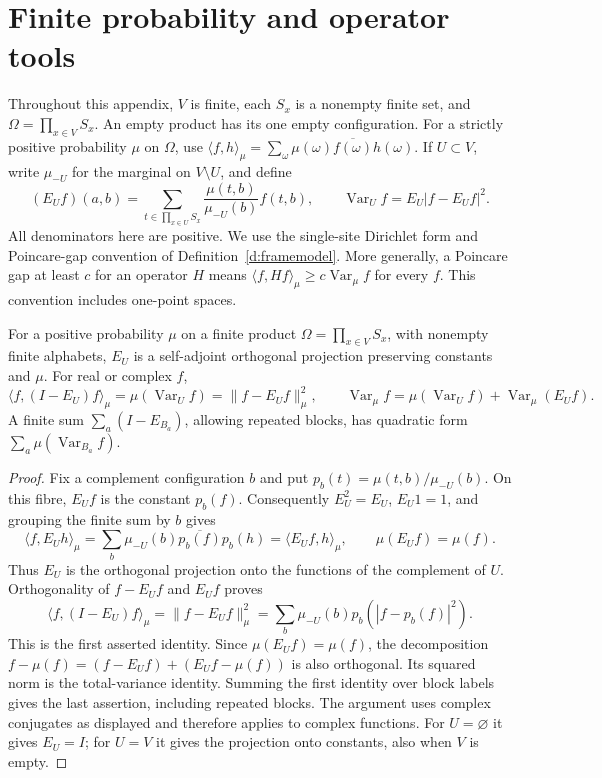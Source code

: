 \section{Finite probability and operator tools}
\label{a:finite}

Throughout this appendix, \(V\) is finite, each \(S_x\) is a
nonempty finite set, and \(\Omega=\prod_{x\in V}S_x\).
An empty product has its one empty configuration.  For a strictly
positive probability \(\mu\) on \(\Omega\), use
\(\langle f,h\rangle_\mu=\sum_\omega\mu(\omega)
\overline{f(\omega)}h(\omega)\).  If \(U\subset V\), write
\(\mu_{-U}\) for the marginal on \(V\setminus U\), and define
\[
 (E_Uf)(a,b)=\sum_{t\in\prod_{x\in U}S_x}
       \frac{\mu(t,b)}{\mu_{-U}(b)}f(t,b),\qquad
 \operatorname{Var}_U f=E_U|f-E_Uf|^2.
\]
All denominators here are positive.  We use the single-site Dirichlet
form and Poincare-gap convention of Definition~\ref{d:framemodel}.
More generally, a Poincare gap at least \(c\) for an operator \(H\)
means \(\langle f,Hf\rangle_\mu\ge c\operatorname{Var}_\mu f\)
for every \(f\).  This convention includes one-point spaces.

\begin{lemma}\label{l:CE}
For a positive probability \(\mu\) on a finite product
\(\Omega=\prod_{x\in V}S_x\), with nonempty finite alphabets,
\(E_U\) is a self-adjoint orthogonal projection preserving constants
and \(\mu\). For real or complex \(f\),
\[
 \langle f,(I-E_U)f\rangle_\mu
   =\mu(\operatorname{Var}_U f)=\|f-E_Uf\|_\mu^2,\qquad
 \operatorname{Var}_\mu f=\mu(\operatorname{Var}_U f)
                          +\operatorname{Var}_\mu(E_Uf).
\]
A finite sum \(\sum_a(I-E_{B_a})\), allowing repeated blocks,
has quadratic form \(\sum_a\mu(\operatorname{Var}_{B_a}f)\).
\end{lemma}

\begin{proof}
Fix a complement configuration \(b\) and put
\(p_b(t)=\mu(t,b)/\mu_{-U}(b)\).
On this fibre, \(E_Uf\) is the constant \(p_b(f)\).  Consequently
\(E_U^2=E_U\), \(E_U1=1\), and grouping the finite sum by \(b\)
gives
\[
 \langle f,E_Uh\rangle_\mu
   =\sum_b\mu_{-U}(b)\overline{p_b(f)}p_b(h)
   =\langle E_Uf,h\rangle_\mu,
 \qquad \mu(E_Uf)=\mu(f).
\]
Thus \(E_U\) is the orthogonal projection onto the functions of
the complement of \(U\).  Orthogonality of \(f-E_Uf\) and \(E_Uf\)
proves
\[
 \langle f,(I-E_U)f\rangle_\mu
   =\|f-E_Uf\|_\mu^2
   =\sum_b\mu_{-U}(b)p_b(|f-p_b(f)|^2).
\]
This is the first asserted identity.  Since \(\mu(E_Uf)=\mu(f)\),
the decomposition
\(f-\mu(f)=(f-E_Uf)+(E_Uf-\mu(f))\) is also orthogonal.
Its squared norm is the total-variance identity.  Summing the first
identity over block labels gives the last assertion, including repeated
blocks.  The argument uses complex conjugates as displayed and therefore
applies to complex functions.  For \(U=\varnothing\) it gives \(E_U=I\);
for \(U=V\) it gives the projection onto constants, also when \(V\)
is empty.
\end{proof}


